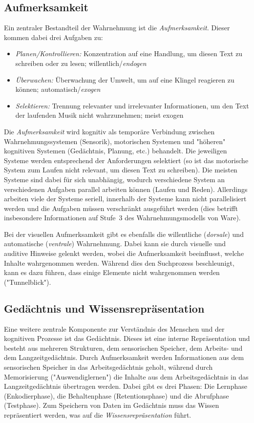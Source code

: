 		\subsection{Aufmerksamkeit}
			Ein zentraler Bestandteil der Wahrnehmung ist die \emph{Aufmerksamkeit.} Dieser kommen dabei drei Aufgaben zu:
			\begin{itemize}
				\item \emph{Planen/Kontrollieren:} Konzentration auf eine Handlung, \zB um diesen Text zu schreiben oder zu lesen; willentlich/\emph{endogen}
				\item \emph{Überwachen:} Überwachung der Umwelt, \zB um auf eine Klingel reagieren zu können; automatisch/\emph{exogen}
				\item \emph{Selektieren:} Trennung relevanter und irrelevanter Informationen, \zB um den Text der laufenden Musik nicht wahrzunehmen; meist exogen
			\end{itemize}
			Die \emph{Aufmerksamkeit} wird kognitiv als temporäre Verbindung zwischen Wahrnehmungssystemen (Sensorik), motorischen Systemen und "höheren" kognitiven Systemen (Gedächtnis, Planung, etc.) behandelt. Die jeweiligen Systeme werden entsprechend der Anforderungen selektiert (so ist das motorische System zum Laufen \bspw nicht relevant, um diesen Text zu schreiben). Die meisten Systeme sind dabei für sich unabhängig, wodurch verschiedene System an verschiedenen Aufgaben parallel arbeiten können (\zB Laufen und Reden). Allerdings arbeiten viele der Systeme seriell, \dh innerhalb der Systeme kann nicht parallelisiert werden und die Aufgaben müssen verschränkt ausgeführt werden (dies betrifft insbesondere Informationen auf Stufe~3 des Wahrnehmungsmodells von Ware).

			Bei der visuellen Aufmerksamkeit gibt es ebenfalls die willentliche (\emph{dorsale}) und automatische (\emph{ventrale}) Wahrnehmung. Dabei kann sie durch visuelle und auditive Hinweise gelenkt werden, wobei die Aufmerksamkeit beeinflusst, welche Inhalte wahrgenommen werden. Während dies den Suchprozess beschleunigt, kann es dazu führen, dass einige Elemente nicht wahrgenommen werden ("Tunnelblick").

		\subsection{Gedächtnis und Wissensrepräsentation}
			Eine weitere zentrale Komponente zur Verständnis des Menschen und der kognitiven Prozesse ist das Gedächtnis. Dieses ist eine interne Repräsentation und besteht aus mehreren Strukturen, dem sensorischen Speicher, dem Arbeits- und dem Langzeitgedächtnis. Durch Aufmerksamkeit werden Informationen aus dem sensorischen Speicher in das Arbeitsgedächtnis geholt, während durch Memorisierung ("Auswendiglernen") die Inhalte aus dem Arbeitsgedächtnis in das Langzeitgedächtnis übertragen werden. Dabei gibt es drei Phasen: Die Lernphase (Enkodierphase), die Behaltenphase (Retentionsphase) und die Abrufphase (Testphase). Zum Speichern von Daten im Gedächtnis muss das Wissen repräsentiert werden, was auf die \emph{Wissensrepräsentation} führt.

